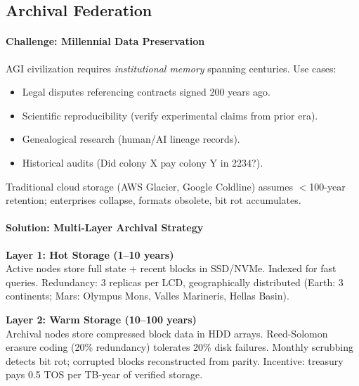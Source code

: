 \documentclass[11pt]{article}
\begin{document}
\subsection{Archival Federation}

\paragraph{Challenge: Millennial Data Preservation}
AGI civilization requires \emph{institutional memory} spanning centuries. Use cases:
\begin{itemize}[noitemsep]
  \item Legal disputes referencing contracts signed 200 years ago.
  \item Scientific reproducibility (verify experimental claims from prior era).
  \item Genealogical research (human/AI lineage records).
  \item Historical audits (Did colony X pay colony Y in 2234?).
\end{itemize}
Traditional cloud storage (AWS Glacier, Google Coldline) assumes $<$100-year retention; enterprises collapse, formats obsolete, bit rot accumulates.

\paragraph{Solution: Multi-Layer Archival Strategy}

\textbf{Layer 1: Hot Storage (1--10 years)}\\
Active nodes store full state + recent blocks in SSD/NVMe. Indexed for fast queries. Redundancy: 3 replicas per LCD, geographically distributed (Earth: 3 continents; Mars: Olympus Mons, Valles Marineris, Hellas Basin).

\textbf{Layer 2: Warm Storage (10--100 years)}\\
Archival nodes store compressed block data in HDD arrays. Reed-Solomon erasure coding (20\% redundancy) tolerates 20\% disk failures. Monthly scrubbing detects bit rot; corrupted blocks reconstructed from parity. Incentive: treasury pays 0.5 TOS per TB-year of verified storage.
\end{document}

